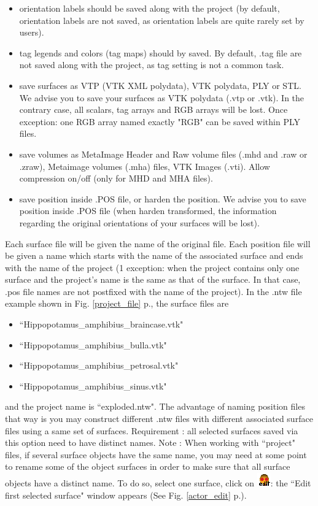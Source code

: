 \begin{itemize}
\item orientation labels should be saved along with the project (by default, orientation labels are not saved, as orientation labels are quite rarely set by users). 
\item tag legends and colors (tag maps) should by saved. By default, .tag file are not saved along with the project, as tag setting is not a common task. 
\item save surfaces as VTP (VTK XML polydata), VTK polydata, PLY or STL. We advise you to save your surfaces as VTK polydata (.vtp or .vtk). In the contrary case, all scalars, tag arrays and RGB arrays  will be lost. Once exception: one RGB array named exactly "RGB" can be saved within PLY files.
\item save volumes as MetaImage Header and Raw volume files (.mhd and .raw or .zraw), Metaimage volumes (.mha) files, VTK Images (.vti). Allow compression on/off (only for MHD and MHA files).
\item save position inside .POS file, or harden the position. We advise you to save position inside .POS file (when harden transformed, the information regarding the original orientations of your surfaces will be lost). 
\end{itemize}
Each surface file will be given the name of the original file. Each position file will be given a name which starts with the name of the associated surface and ends with the name of the project (1 exception: when the project contains only one surface and  the project's name is the same as that of the surface. In that case, .pos file names are not postfixed with the name of the project). In the .ntw file example shown in Fig. \ref{project_file} p.\pageref{project_file}, the surface files are 
\begin{itemize}
\item ``Hippopotamus\_amphibius\_braincase.vtk" 
\item ``Hippopotamus\_amphibius\_bulla.vtk" 
\item ``Hippopotamus\_amphibius\_petrosal.vtk" 
\item ``Hippopotamus\_amphibius\_sinus.vtk" 
\end{itemize}
\noindent and the project name is ``exploded.ntw". The advantage of naming position files that way is you may construct different .ntw files with different associated surface files using a same set of surfaces. Requirement : all selected surfaces saved via this option
need to have distinct names. Note : When working with ``project" files, if several surface objects have the same name, you may need at
some point to rename some of the object surfaces in order to make sure that all surface objects have a distinct name. To do so, select one surface, click on \includegraphics[scale=0.7]{images/06/objects/actor_edit.png}: the ``Edit first selected surface" window appears (See Fig. \ref{actor_edit} p.\pageref{actor_edit}).




